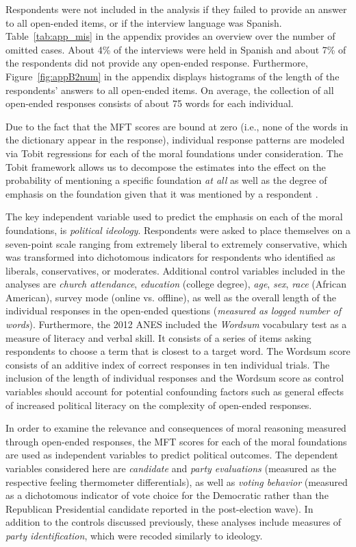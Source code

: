 \documentclass[12pt]{article}
\begin{document}
Respondents were not included in the analysis if they failed to provide an answer to all open-ended items, or if the interview language was Spanish. Table~\ref{tab:app_mis} in the appendix provides an overview over the number of omitted cases. About 4\% of the interviews were held in Spanish and about 7\% of the respondents did not provide any open-ended response. Furthermore, Figure~\ref{fig:appB2num} in the appendix displays histograms of the length of the respondents' answers to all open-ended items. On average, the collection of all open-ended responses consists of about 75 words for each individual.

Due to the fact that the MFT scores are bound at zero (i.e., none of the words in the dictionary appear in the response), individual response patterns are modeled via Tobit regressions for each of the moral foundations under consideration. The Tobit framework allows us to decompose the estimates into the effect on the probability of mentioning a specific foundation \textit{at all} as well as the degree of emphasis on the foundation given that it was mentioned by a respondent \citep[see][for details on the decomposition of Tobit model estimates]{mcdonald1980uses}.

The key independent variable used to predict the emphasis on each of the moral foundations, is \textit{political ideology}. Respondents were asked to place themselves on a seven-point scale ranging from extremely liberal to extremely conservative, which was transformed into dichotomous indicators for respondents who identified as liberals, conservatives, or moderates. Additional control variables included in the analyses are \textit{church attendance}, \textit{education} (college degree), \textit{age}, \textit{sex}, \textit{race} (African American), survey mode (online vs. offline), as well as the overall length of the individual responses in the open-ended questions (\textit{measured as logged number of words}). Furthermore, the 2012 ANES included the \textit{Wordsum} vocabulary test as a measure of literacy and verbal skill. It consists of a series of items asking respondents to choose a term that is closest to a target word. The Wordsum score consists of an additive index of correct responses in ten individual trials. The inclusion of the length of individual responses and the Wordsum score as control variables should account for potential confounding factors such as general effects of increased political literacy on the complexity of open-ended responses.

In order to examine the relevance and consequences of moral reasoning measured through open-ended responses, the MFT scores for each of the moral foundations are used as independent variables to predict political outcomes. The dependent variables considered here are \textit{candidate} and \textit{party evaluations} (measured as the respective feeling thermometer differentials), as well as \textit{voting behavior} (measured as a dichotomous indicator of vote choice for the Democratic rather than the Republican Presidential candidate reported in the post-election wave). In addition to the controls discussed previously, these analyses include measures of \textit{party identification}, which were recoded similarly to ideology.
\end{document}

